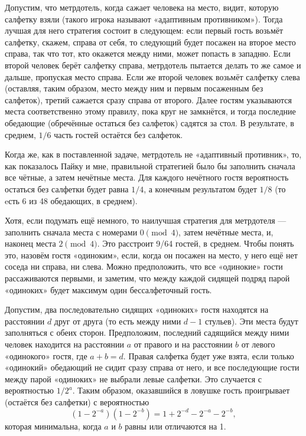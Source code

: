 Допустим, что метрдотель, когда сажает человека на место, видит, которую салфетку взяли (такого игрока называют «адаптивным противником»). %
Тогда лучшая для него стратегия состоит в следующем:
если первый гость возьмёт салфетку, скажем, справа от себя, то следующий будет посажен на второе место справа, так что тот, кто окажется между ними, может попасть в западню.
Если второй человек берёт салфетку справа, метрдотель пытается делать то же самое и дальше, пропуская место справа.
Если же второй человек возьмёт салфетку слева (оставляя, таким образом, место между ним и первым посаженным без салфеток), третий сажается сразу справа от второго.
Далее гостям указываются места соответственно этому правилу, пока круг не замкнётся, и тогда последние обедающие (обречённые остаться без салфеток) садятся за стол.
В результате, в среднем, $1/6$ часть гостей остаётся без салфеток.

Когда же, как в поставленной задаче, метрдотель не «адаптивный противник», то, как показалось Пайку и мне, правильной стратегией было бы заполнить сначала все чётные, а затем нечётные места.
Для каждого нечётного гостя вероятность остаться без салфетки будет равна $1/4$, %
а конечным результатом будет $1/8$ (то eсть 6 из 48 обедающих, в среднем).

Хотя, если подумать ещё немного, то наилучшая стратегия для метрдотеля --- заполнить сначала места с номерами $0\pmod4$, затем нечётные места, и, наконец места $2\pmod4$.
Это расстроит 9/64 гостей, в среднем.
Чтобы понять это, назовём гостя «одиноким», если, когда он посажен на место, у него ещё нет соседа ни справа, ни слева.
Можно предположить, что все «одинокие» гости рассаживаются первыми, и заметим, что между каждой сидящей подряд парой «одиноких» будет максимум один бессалфеточный гость.

Допустим, два последовательно сидящих «одиноких» гостя находятся на расстоянии $d$ друг от друга (то есть между ними $d-1$ стульев).
Эти места будут заполняться с обеих сторон.
Предположим, последний садящийся между ними человек находится на расстоянии $a$ от правого и на расстоянии $b$ от левого «одинокого» гостя, где $a+b=d$.
Правая салфетка будет уже взята, если только «одинокий» обедающий не сидит сразу справа от него, и все последующие гости между парой «одиноких» не выбрали левые салфетки.
Это случается с вероятностью $1/2^a$.
Таким образом, оказавшийся в ловушке 
гость проигрывает (остаётся без салфетки) с вероятностью
\[(1-2^{-a})(1-2^{-b})=1 + 2^{-d}-2^{-a}-2^{-b},\]
которая минимальна, когда $a$ и $b$ равны или отличаются на 1.

